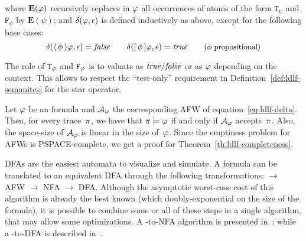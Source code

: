 \endgroup
where $\mathbf{E}(\varphi)$ recursively replaces in $\varphi$ all
occurrences of atoms of the form $\mathtt{T}_\psi$ and $\mathtt{F}_\psi$ by
$\mathbf{E}(\psi)$; and $\delta(\varphi, \epsilon)$ is defined inductively as
above, except for the following base cases:
\begin{equation*}
	\delta(\langle\, {\phi} \,\rangle\varphi, \epsilon) = \text{\textit{false}} \qquad
	\delta([\, {\phi} \,]\varphi, \epsilon) = \text{\textit{true}} \qquad
	\text{\small ($\phi$ propositional)}
\end{equation*}

The role of $\mathtt{T}_\varphi$ and $\mathtt{F}_\varphi$ is to valuate as
$\text{\textit{true}}/\text{\textit{false}}$ or as $\varphi$ depending on the context. This allows to
respect the ``test-only'' requirement in Definition~\ref{def:ldlf-semanitcs}
for the star operator.

Let $\varphi$ be an \ldl{} formula and $\mathcal{A}_\varphi$ the corresponding
AFW of equation~\ref{eq:ldlf-delta}. Then, for every trace~$\pi$, we have
that $\pi \models \varphi$ if and only if $\mathcal{A}_\varphi$
accepts~$\pi$. Also, the space-size of $\mathcal{A}_\varphi$ is linear in the
size of~$\varphi$. Since the emptiness problem for AFWs is PSPACE-complete,
we get a proof for Theorem~\vref{th:ldlf-completeness}.

DFAs are the easiest automata to visualize and simulate. A \ldl{} formula can
be translated to an equivalent DFA through the following transformations:
\ldl{} $\to$ AFW $\to$ NFA $\to$ DFA. Although the asymptotic worst-case cost
of this algorithm is already the best known (which doubly-exponential on the
size of the formula), it is possible to combine some or all of these steps in
a single algorithm, that may allow some optimizations. A \ldl{}-to-NFA
algorithm is presented in~\cite{bib:degiacomo-logic-nmrdp}; while a
\ldl{}-to-DFA is described in~\cite{bib:favorito-thesis}.


